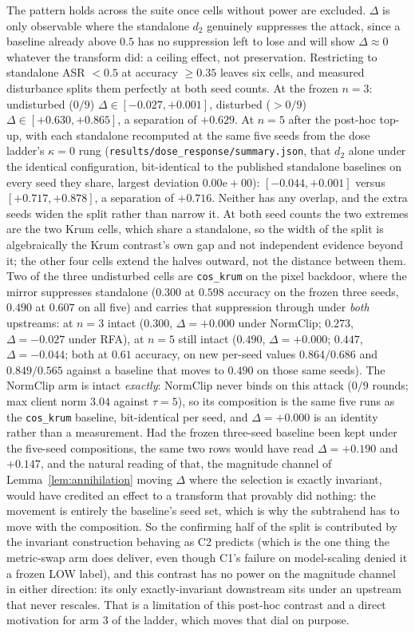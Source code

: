 \documentclass{article}
\begin{document}
The pattern holds across the suite once cells without power are excluded. $\Delta$ is only observable where the standalone $d_2$ genuinely suppresses the attack, since a baseline already above $0.5$ has no suppression left to lose and will show $\Delta \approx 0$ whatever the transform did: a ceiling effect, not preservation. Restricting to standalone ASR $< 0.5$ at accuracy $\ge 0.35$ leaves six cells, and measured disturbance splits them perfectly at both seed counts. At the frozen $n{=}3$: undisturbed ($0/9$) $\Delta \in [-0.027, +0.001]$, disturbed ($>0/9$) $\Delta \in [+0.630, +0.865]$, a separation of $+0.629$. At $n{=}5$ after the post-hoc top-up, with each standalone recomputed at the same five seeds from the dose ladder's $\kappa{=}0$ rung (\texttt{results/dose\_response/summary.json}, that $d_2$ alone under the identical configuration, bit-identical to the published standalone baselines on every seed they share, largest deviation $0.00\mathrm{e}{+}00$): $[-0.044, +0.001]$ versus $[+0.717, +0.878]$, a separation of $+0.716$. Neither has any overlap, and the extra seeds widen the split rather than narrow it. At both seed counts the two extremes are the two Krum cells, which share a standalone, so the width of the split is algebraically the Krum contrast's own gap and not independent evidence beyond it; the other four cells extend the halves outward, not the distance between them. Two of the three undisturbed cells are \texttt{cos\_krum} on the pixel backdoor, where the mirror suppresses standalone ($0.300$ at $0.598$ accuracy on the frozen three seeds, $0.490$ at $0.607$ on all five) and carries that suppression through under \emph{both} upstreams: at $n{=}3$ intact ($0.300$, $\Delta = +0.000$ under NormClip; $0.273$, $\Delta = -0.027$ under RFA), at $n{=}5$ still intact ($0.490$, $\Delta = +0.000$; $0.447$, $\Delta = -0.044$; both at $0.61$ accuracy, on new per-seed values $0.864 / 0.686$ and $0.849 / 0.565$ against a baseline that moves to $0.490$ on those same seeds). The NormClip arm is intact \emph{exactly}: NormClip never binds on this attack ($0/9$ rounds; max client norm $3.04$ against $\tau = 5$), so its composition is the same five runs as the \texttt{cos\_krum} baseline, bit-identical per seed, and $\Delta = +0.000$ is an identity rather than a measurement. Had the frozen three-seed baseline been kept under the five-seed compositions, the same two rows would have read $\Delta = +0.190$ and $+0.147$, and the natural reading of that, the magnitude channel of Lemma~\ref{lem:annihilation} moving $\Delta$ where the selection is exactly invariant, would have credited an effect to a transform that provably did nothing: the movement is entirely the baseline's seed set, which is why the subtrahend has to move with the composition. So the confirming half of the split is contributed by the invariant construction behaving as C2 predicts (which is the one thing the metric-swap arm does deliver, even though C1's failure on model-scaling denied it a frozen LOW label), and this contrast has no power on the magnitude channel in either direction: its only exactly-invariant downstream sits under an upstream that never rescales. That is a limitation of this post-hoc contrast and a direct motivation for arm 3 of the ladder, which moves that dial on purpose.
\end{document}
